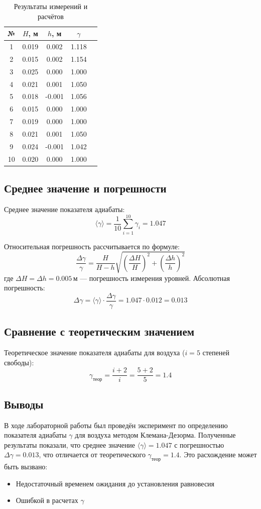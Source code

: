 \documentclass[a4paper]{article}
\begin{document}
\begin{table}[h!]
\centering
\caption{Результаты измерений и расчётов}
\begin{tabular}{|c|c|c|c|c|}
\hline
№ & \(H\), м & \(h\), м & \(\gamma\) \\ \hline
1  & 0.019 & 0.002  & 1.118 \\ \hline
2  & 0.015 & 0.002  & 1.154 \\ \hline
3  & 0.025 & 0.000  & 1.000 \\ \hline
4  & 0.021 & 0.001  & 1.050 \\ \hline
5  & 0.018 & -0.001 & 1.056 \\ \hline
6  & 0.015 & 0.000  & 1.000 \\ \hline
7  & 0.019 & 0.000  & 1.000 \\ \hline
8  & 0.021 & 0.001  & 1.050 \\ \hline
9  & 0.024 & -0.001 & 1.042 \\ \hline
10 & 0.020 & 0.000  & 1.000 \\ \hline
\end{tabular}
\end{table}

\subsection{Среднее значение и погрешности}
Среднее значение показателя адиабаты:
\[
\langle \gamma \rangle = \frac{1}{10} \sum_{i=1}^{10} \gamma_i = 1.047
\]

Относительная погрешность рассчитывается по формуле:
\[
\frac{\Delta \gamma}{\gamma} = \frac{H}{H - h} \sqrt{\left( \frac{\Delta H}{H} \right)^2 + \left( \frac{\Delta h}{h} \right)^2}
\]
где \(\Delta H = \Delta h = 0.005 \, \text{м}\) — погрешность измерения уровней. Абсолютная погрешность:
\[
\Delta \gamma = \langle \gamma \rangle \cdot \frac{\Delta \gamma}{\gamma} = 1.047 \cdot 0.012 = 0.013
\]

\subsection{Сравнение с теоретическим значением}
Теоретическое значение показателя адиабаты для воздуха (\(i = 5\) степеней свободы):
\[
\gamma_{\text{теор}} = \frac{i + 2}{i} = \frac{5 + 2}{5} = 1.4
\]

\subsection{Выводы}
В ходе лабораторной работы был проведён эксперимент по определению показателя адиабаты \(\gamma\) для воздуха методом Клемана-Дезорма. Полученные результаты показали, что среднее значение \(\langle \gamma \rangle = 1.047\) с погрешностью \(\Delta \gamma = 0.013\), что отличается от теоретического \(\gamma_{\text{теор}} = 1.4\). Это расхождение может быть вызвано:
\begin{itemize}
    \item Недостаточный временем ожидания до установления равновесия
    \item Ошибкой в расчетах $\gamma$
\end{itemize}
\end{document}
